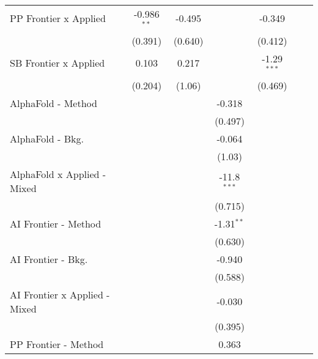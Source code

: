 \begin{tabular}{lcccccc}
   PP Frontier x Applied          & -0.986$^{**}$ & -0.495        &               & -0.349        &        &   \\   
                                  & (0.391)       & (0.640)       &               & (0.412)       &        &   \\   
   SB Frontier x Applied          & 0.103         & 0.217         &               & -1.29$^{***}$ &        &   \\   
                                  & (0.204)       & (1.06)        &               & (0.469)       &        &   \\   
   AlphaFold - Method             &               &               & -0.318        &               &        &   \\   
                                  &               &               & (0.497)       &               &        &   \\   
   AlphaFold - Bkg.               &               &               & -0.064        &               &        &   \\   
                                  &               &               & (1.03)        &               &        &   \\   
   AlphaFold x Applied - Mixed    &               &               & -11.8$^{***}$ &               &        &   \\   
                                  &               &               & (0.715)       &               &        &   \\   
   AI Frontier - Method           &               &               & -1.31$^{**}$  &               &        &   \\   
                                  &               &               & (0.630)       &               &        &   \\   
   AI Frontier - Bkg.             &               &               & -0.940        &               &        &   \\   
                                  &               &               & (0.588)       &               &        &   \\   
   AI Frontier x Applied - Mixed  &               &               & -0.030        &               &        &   \\   
                                  &               &               & (0.395)       &               &        &   \\   
   PP Frontier - Method           &               &               & 0.363         &               &        &   \\   

\end{tabular}
